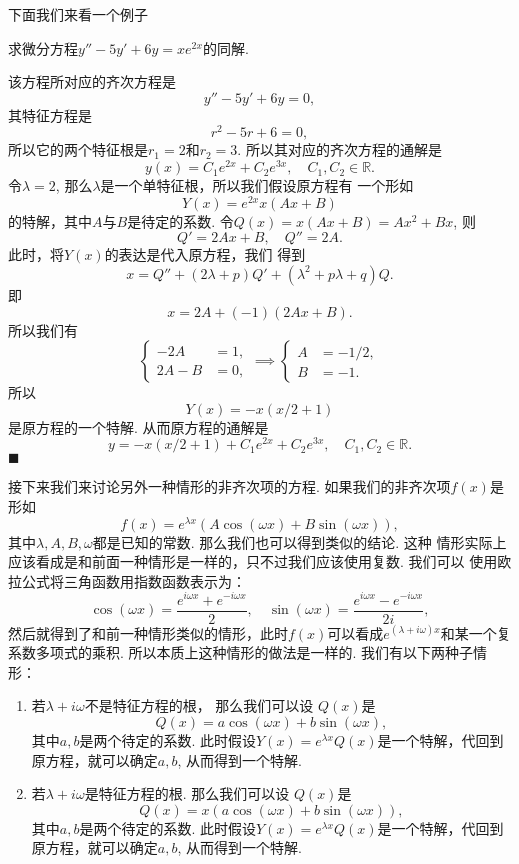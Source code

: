 \documentclass[a4paper, titlepage, twoside]{article}
\newenvironment{jie}{\noindent{\bf 解:}}{\hfill$\blacksquare$\par}
\numberwithin{equation}{section}
\begin{document}
下面我们来看一个例子

\begin{example}[P362, 例2]
	求微分方程$y''-5y' + 6y=xe^{2x}$的同解. 
\end{example}
\begin{jie}
	该方程所对应的齐次方程是
	$$ y'' -5 y' + 6y = 0,$$
	其特征方程是
	$$ r^2 -5r + 6 = 0,$$
	所以它的两个特征根是$r_1=2$和$r_2=3$.
	所以其对应的齐次方程的通解是
	$$ y(x) = C_1 e^{2x} + C_2 e^{3x}, \quad C_1, C_2 \in \mathbb{R}.$$
	令$\lambda = 2$, 那么$\lambda$是一个单特征根，所以我们假设原方程有
	一个形如
	$$ Y(x) = e^{2x} x(Ax+B)$$
	的特解，其中$A$与$B$是待定的系数. 令$Q(x)=x(Ax+B)=Ax^2 +Bx$, 
	则
	$$ Q'=2Ax+B, \quad Q'' = 2A.$$ 
	此时，将$Y(x)$的表达是代入原方程，我们
	得到
	$$  x = Q'' + (2\lambda +p) Q' + (\lambda^2 + p\lambda + q) Q.$$
	即
	$$ x = 2A + (-1)(2Ax+B).$$
	所以我们有
	$$\begin{cases}
		-2A &= 1, \\
		2A-B &=0,
	\end{cases}
	\implies 
	\begin{cases}
		A&=-1/2, \\
		B&=-1.
	\end{cases}
	$$
	所以
	$$ Y(x) = -x(x/2+1)$$
	是原方程的一个特解. 从而原方程的通解是
	$$ y = -x(x/2+1) + C_1e^{2x} + C_2 e^{3x}, \quad C_1, C_2 \in
	\mathbb{R}.$$
\end{jie}

接下来我们来讨论另外一种情形的非齐次项的方程. 如果我们的非齐次项$f(x)$是形如
$$ f(x) = e^{\lambda x} (A\cos(\omega x) + B\sin(\omega x)), $$
其中$\lambda, A, B, \omega$都是已知的常数. 那么我们也可以得到类似的结论. 这种
情形实际上应该看成是和前面一种情形是一样的，只不过我们应该使用复数. 我们可以
使用欧拉公式将三角函数用指数函数表示为：
$$ \cos(\omega x) = \frac{e^{i\omega x} + e^{-i\omega x}}{2}, \quad 
\sin(\omega x) = \frac{e^{i\omega x} - e^{-i\omega x}}{2i},$$
然后就得到了和前一种情形类似的情形，此时$f(x)$可以看成$e^{(\lambda + i\omega)
x}$和某一个复系数多项式的乘积. 所以本质上这种情形的做法是一样的. 
我们有以下两种子情形：

\begin{enumerate}
	\item 若$\lambda + i\omega$不是特征方程的根， 那么我们可以设
		$Q(x)$是
		$$ Q(x) = a\cos(\omega x) + b\sin(\omega x), $$
		其中$a, b$是两个待定的系数. 此时假设$Y(x) = e^{\lambda x}
		Q(x)$是一个特解，代回到原方程，就可以确定$a, b$,
		从而得到一个特解. 
	\item 若$\lambda + i\omega$是特征方程的根. 那么我们可以设
		$Q(x)$是
		$$ Q(x) = x(a\cos(\omega x) + b \sin(\omega x)), $$
		其中$a, b$是两个待定的系数. 此时假设$Y(x) = e^{\lambda x}
		Q(x)$是一个特解，代回到原方程，就可以确定$a, b$,
		从而得到一个特解. 
\end{enumerate}
\end{document}
